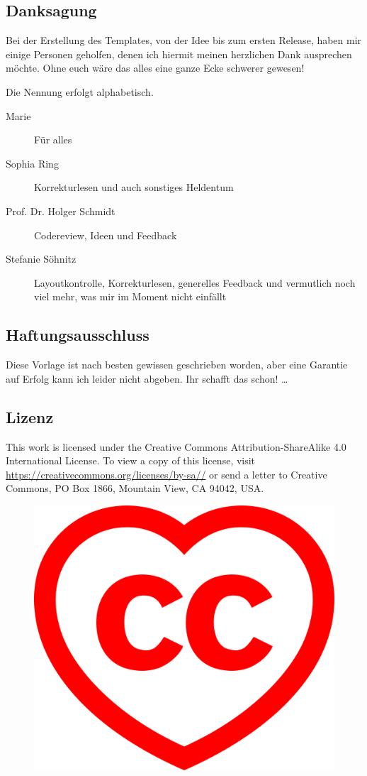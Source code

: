 \subsection{Danksagung}
\label{sec:thx}
Bei der Erstellung des Templates, von der Idee bis zum ersten Release, haben mir einige Personen geholfen, denen ich hiermit meinen herzlichen Dank ausprechen möchte. Ohne euch wäre das alles eine ganze Ecke schwerer gewesen! 

Die Nennung erfolgt alphabetisch.
\begin{description}
  \item[Marie] Für alles
  \item[Sophia Ring] Korrekturlesen und auch sonstiges Heldentum
  \item[Prof. Dr. Holger Schmidt] Codereview, Ideen und Feedback
  \item[Stefanie Söhnitz] Layoutkontrolle, Korrekturlesen, generelles Feedback und vermutlich noch viel mehr, was mir im Moment nicht einfällt
\end{description}
\subsection{Haftungsausschluss}%
\label{sec:haftausschl}
Diese Vorlage ist nach besten gewissen geschrieben worden, aber eine Garantie auf Erfolg kann ich leider nicht abgeben. Ihr schafft das schon!
\dots%
\subsection{Lizenz}%
\label{sec:licence}
This work is licensed under the Creative Commons Attribution-ShareAlike 4.0 International License. To view a copy of this license, visit \href{https://creativecommons.org/licenses/by-sa/4.0/}{https://creativecommons.org/\-licenses/\-by-sa//} or send a letter to Creative Commons, PO Box 1866, Mountain View, CA 94042, USA.
\begin{figure}[hb]
  \centering
  \includegraphics[width=0.7\columnwidth]{graphics/ccheart_red.pdf}
\end{figure}%
